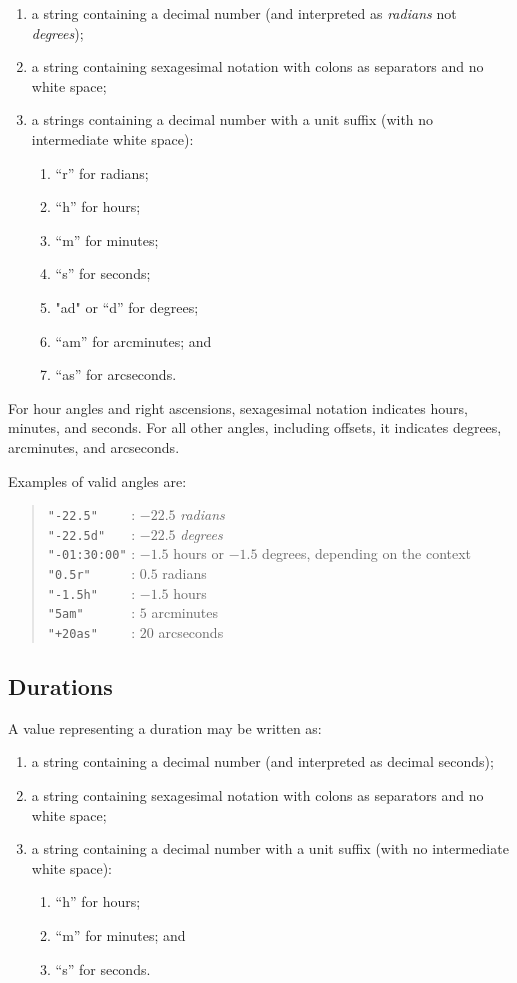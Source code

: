 \begin{enumerate}
    \item a string containing a decimal number (and interpreted as \emph{radians} not \emph{degrees});
    \item a string containing sexagesimal notation with colons as separators and no white space;
    \item a strings containing a decimal number with a unit suffix (with no intermediate white space):
    \begin{enumerate}
        \item “r” for radians;
        \item “h” for hours;
        \item “m” for minutes;
        \item “s” for seconds;
        \item "ad" or “d” for degrees;
        \item “am” for arcminutes; and
        \item “as” for arcseconds.
    \end{enumerate}
\end{enumerate}

For hour angles and right ascensions, sexagesimal notation indicates hours, minutes, and seconds. For all other angles, including offsets, it indicates degrees, arcminutes, and arcseconds.

Examples of valid angles are:
\begin{quote}
\verb|"-22.5"    | : $-22.5$ \emph{radians}\\
\verb|"-22.5d"   | : $-22.5$ \emph{degrees}\\
\verb|"-01:30:00"| : $-1.5$ hours or $-1.5$ degrees, depending on the context\\
\verb|"0.5r"     | : $0.5$ radians\\
\verb|"-1.5h"    | : $-1.5$ hours\\
\verb|"5am"      | : $5$ arcminutes\\
\verb|"+20as"    | : $20$ arcseconds
\end{quote}

\subsection{Durations}

A value representing a duration may be written as:
\begin{enumerate}
\item a string containing a decimal number (and interpreted as decimal seconds);
\item a string containing sexagesimal notation with colons as separators and no white space;
\item a string containing a decimal number with a unit suffix (with no intermediate white space):
\begin{enumerate}
    \item “h” for hours;
    \item “m” for minutes; and
    \item “s” for seconds.
\end{enumerate}
\end{enumerate}

